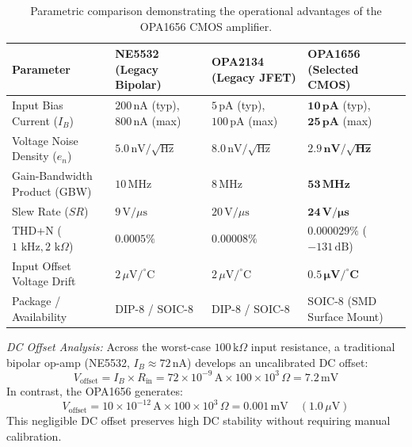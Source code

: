 \documentclass[11pt, letterpaper]{article}
\begin{document}
\begin{table}[H]
    \centering
    \small
    \setlength{\tabcolsep}{4pt}
    \begin{tabularx}{\textwidth}{@{} l L L L @{}}
        \toprule
        \textbf{Parameter} & \textbf{NE5532 (Legacy Bipolar)} & \textbf{OPA2134 (Legacy JFET)} & \textbf{OPA1656 (Selected CMOS)} \\
        \midrule
        Input Bias Current ($I_B$) & $200\,\text{nA}$ (typ), $800\,\text{nA}$ (max) & $5\,\text{pA}$ (typ), $100\,\text{pA}$ (max) & $\mathbf{10\,\text{pA}}$ (typ), $\mathbf{25\,\text{pA}}$ (max) \\
        Voltage Noise Density ($e_n$) & $5.0\,\text{nV}/\sqrt{\text{Hz}}$ & $8.0\,\text{nV}/\sqrt{\text{Hz}}$ & $\mathbf{2.9\,\text{nV}/\sqrt{\text{Hz}}}$ \\
        Gain-Bandwidth Product (GBW) & $10\,\text{MHz}$ & $8\,\text{MHz}$ & $\mathbf{53\,\text{MHz}}$ \\
        Slew Rate ($SR$) & $9\,\text{V}/\mu\text{s}$ & $20\,\text{V}/\mu\text{s}$ & $\mathbf{24\,\text{V}/\mu\text{s}}$ \\
        THD+N ($1\text{ kHz}, 2\text{ k}\Omega$) & $0.0005\%$ & $0.00008\%$ & $\mathbf{0.000029\%}$ ($-131\,\text{dB}$) \\
        Input Offset Voltage Drift & $2\,\mu\text{V}/^\circ\text{C}$ & $2\,\mu\text{V}/^\circ\text{C}$ & $\mathbf{0.5\,\mu\text{V}/^\circ\text{C}}$ \\
        Package / Availability & DIP-8 / SOIC-8 & DIP-8 / SOIC-8 & SOIC-8 (SMD Surface Mount) \\
        \bottomrule
    \end{tabularx}
    \caption{Parametric comparison demonstrating the operational advantages of the OPA1656 CMOS amplifier.}
    \label{tab:opamp}
\end{table}

\textit{DC Offset Analysis:} Across the worst-case $100\,\text{k}\Omega$ input resistance, a traditional bipolar op-amp (NE5532, $I_B \approx 72\,\text{nA}$) develops an uncalibrated DC offset:
\begin{equation}
    V_{\text{offset}} = I_B \times R_{\text{in}} = 72 \times 10^{-9}\,\text{A} \times 100 \times 10^3\,\Omega = 7.2\,\text{mV}
\end{equation}
In contrast, the OPA1656 generates:
\begin{equation}
    V_{\text{offset}} = 10 \times 10^{-12}\,\text{A} \times 100 \times 10^3\,\Omega = 0.001\,\text{mV} \quad (1.0\,\mu\text{V})
\end{equation}
This negligible DC offset preserves high DC stability without requiring manual calibration.
\end{document}
